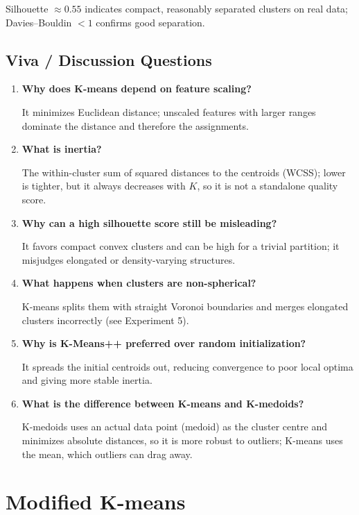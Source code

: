 Silhouette $\approx 0.55$ indicates compact, reasonably separated clusters on real data;
Davies--Bouldin $< 1$ confirms good separation.

\section{Viva / Discussion Questions}
\begin{enumerate}
  \item \textbf{Why does K-means depend on feature scaling?}\par\nobreak It minimizes Euclidean distance;
  unscaled features with larger ranges dominate the distance and therefore the assignments.
  \item \textbf{What is inertia?}\par\nobreak The within-cluster sum of squared distances to the centroids
  (WCSS); lower is tighter, but it always decreases with $K$, so it is not a standalone
  quality score.
  \item \textbf{Why can a high silhouette score still be misleading?}\par\nobreak It favors compact convex
  clusters and can be high for a trivial partition; it misjudges elongated or
  density-varying structures.
  \item \textbf{What happens when clusters are non-spherical?}\par\nobreak K-means splits them with straight
  Voronoi boundaries and merges elongated clusters incorrectly (see Experiment 5).
  \item \textbf{Why is K-Means++ preferred over random initialization?}\par\nobreak It spreads the initial
  centroids out, reducing convergence to poor local optima and giving more stable inertia.
\item \textbf{What is the difference between K-means and K-medoids?}\par\nobreak K-medoids uses an actual data point (medoid) as the cluster centre and minimizes absolute distances, so it is more robust to outliers; K-means uses the mean, which outliers can drag away.
\end{enumerate}


\chapter{Modified K-means}\label{exp:02}

